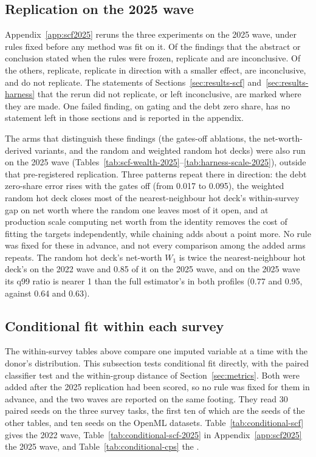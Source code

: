 \subsection{Replication on the 2025 wave}
\label{sec:results-2025}

Appendix~\ref{app:scf2025} reruns the three \scf{} experiments on the 2025
wave, under rules fixed before any method was fit on it. Of the
 findings that the abstract or conclusion stated when the
rules were frozen,  replicate and
 are inconclusive. Of the
 others,  replicate,
 replicate in direction with a smaller
effect,  are inconclusive, and
 do not replicate. The statements of
Sections~\ref{sec:results-scf} and~\ref{sec:results-harness} that the rerun
did not replicate, or left inconclusive, are marked where they are made. One
failed finding, on gating and the \scf{} debt zero share, has no statement
left in those sections and is reported in the appendix.

The arms that distinguish these findings (the gates-off ablations, the
net-worth-derived variants, and the random and weighted random hot decks)
were also run on the 2025 wave
(Tables~\ref{tab:scf-wealth-2025}--\ref{tab:harness-scale-2025}), outside
that pre-registered replication. Three patterns repeat there in direction:
the debt zero-share error rises with the gates off (from 0.017 to 0.095),
the weighted random hot deck closes most of the nearest-neighbour hot deck's
within-survey gap on net worth where the random one leaves most of it open,
and at production scale computing net worth from the identity removes the
cost of fitting the targets independently, while chaining adds about a point
more. No rule
was fixed for these in advance, and not every comparison among the added
arms repeats. The random hot deck's net-worth $W_1$ is twice the
nearest-neighbour hot deck's on the 2022 wave and 0.85 of it on the 2025
wave, and on the 2025 wave its q99 ratio is nearer 1 than the full
estimator's in both profiles (0.77 and 0.95, against 0.64 and 0.63).

\subsection{Conditional fit within each survey}
\label{sec:results-conditional}

The within-survey tables above compare one imputed variable at a time with
the donor's distribution. This subsection tests conditional fit directly,
with the paired classifier test and the within-group distance of
Section~\ref{sec:metrics}. Both were added after the 2025 replication had
been scored, so no rule was fixed for them in advance, and the two waves are
reported on the same footing. They read 30 paired seeds on the three survey
tasks, the first ten of which are the seeds of the other tables, and ten
seeds on the OpenML datasets. Table~\ref{tab:conditional-scf} gives the 2022
wave, Table~\ref{tab:conditional-scf-2025} in Appendix~\ref{app:scf2025} the
2025 wave, and Table~\ref{tab:conditional-cps} the \cps{}.

